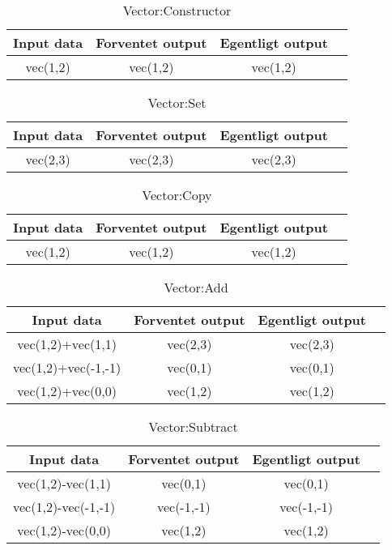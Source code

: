 \begin{table}[ht]
	\caption{Vector:Constructor}
	\centering
	\begin{tabular}{c c c c}
		\hline\hline
		Input data & Forventet output & Egentligt output \\ [0.5ex]
		\hline
		vec(1,2) & vec(1,2) & vec(1,2) \\
		\hline
	\end{tabular}
	\label{table:vectorConstructor}
\end{table}

\begin{table}[ht]
	\caption{Vector:Set}
	\centering
	\begin{tabular}{c c c c}
		\hline\hline
		Input data & Forventet output & Egentligt output \\ [0.5ex]
		\hline
		vec(2,3) & vec(2,3) & vec(2,3) \\
		\hline
	\end{tabular}
	\label{table:vectorSet}
\end{table}

\begin{table}[ht]
	\caption{Vector:Copy}
	\centering
	\begin{tabular}{c c c c}
		\hline\hline
		Input data & Forventet output & Egentligt output \\ [0.5ex]
		\hline
		vec(1,2) & vec(1,2) & vec(1,2) \\
		\hline
	\end{tabular}
	\label{table:vectorCopy}
\end{table}

\begin{table}[ht]
	\caption{Vector:Add}
	\centering
	\begin{tabular}{c c c c}
		\hline\hline
		Input data & Forventet output & Egentligt output \\ [0.5ex]
		\hline
		vec(1,2)+vec(1,1) & vec(2,3) & vec(2,3)\\
		vec(1,2)+vec(-1,-1) & vec(0,1) & vec(0,1)\\
		vec(1,2)+vec(0,0) & vec(1,2) & vec(1,2)\\
		\hline
	\end{tabular}
	\label{table:vectorAdd}
\end{table}

\begin{table}[ht]
	\caption{Vector:Subtract}
	\centering
	\begin{tabular}{c c c c}
		\hline\hline
		Input data & Forventet output & Egentligt output \\ [0.5ex]
		\hline
		vec(1,2)-vec(1,1) & vec(0,1) & vec(0,1)\\
		vec(1,2)-vec(-1,-1) & vec(-1,-1) & vec(-1,-1)\\
		vec(1,2)-vec(0,0) & vec(1,2) & vec(1,2)\\
		\hline
	\end{tabular}
	\label{table:vectorSubtract}
\end{table}

